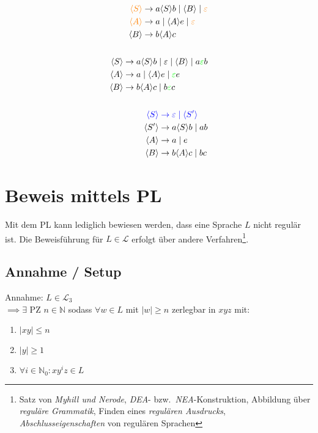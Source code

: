 \documentclass[a4paper,parskip=half,footsepline=on,headings=normal,titlepage=false]{scrartcl}
\newcommand{\nt}[1]{\langle \uppercase{#1} \rangle}
\renewcommand{\epsilon}{\varepsilon}
\begin{document}
\begin{subequations}
\begin{align}
    \label{eq:epsilon:1_search}
    \begin{split}
    \color{orange}\nt{S} & \to a \nt{S} b \mid \nt{B} \mid \color{orange}\epsilon \\
    \color{orange}\nt{A} & \to a \mid \nt{A}e \mid \color{orange}\epsilon \\
    \nt{B} & \to b\nt{A}c
    \end{split}
    \\ \nonumber \\
    \label{eq:epsilon:2_elemination}
    \begin{split}
    \nt{S} & \to a \nt{S} b \mid \epsilon \mid \nt{B} \mid a{\color{green}\epsilon}b \\
    \nt{A} & \to a \mid \nt{A}e \mid {\color{green}\epsilon}e \\
    \nt{B} & \to b\nt{A}c \mid b{\color{green}\epsilon}c
    \end{split}
    \\ \nonumber \\
    \label{eq:epsilon:3_isolation}
    \begin{split}
    \color{blue}\nt{S} & \color{blue}\to \epsilon \mid \nt{S'} \\
    \nt{S'} & \to a \nt{S} b \mid ab \\
    \nt{A} & \to a \mid e \\
    \nt{B} & \to b\nt{A}c \mid bc
    \end{split}
\end{align}
\end{subequations}

\section{Beweis mittels \acl{PL}}
Mit dem \ac{PL} kann lediglich bewiesen werden, dass eine Sprache $L$ nicht regulär ist.
Die Beweisführung für $L \in \mathcal{L}$ erfolgt über andere Verfahren\footnote{Satz von \emph{Myhill und Nerode}, \emph{\acs{DEA}}- bzw.\ \emph{\acs{NEA}}-Konstruktion, Abbildung über \emph{reguläre Grammatik}, Finden eines \emph{regulären Ausdrucks}, \emph{Abschlusseigenschaften} von regulären Sprachen}.

\subsection{Annahme / Setup}
Annahme: $L \in \mathcal{L}_3$ \\
$\implies \exists$ \acl{PZ} $n \in \mathbb{N}$ sodass $\forall w \in L$ mit $|w| \ge n$ zerlegbar in $xyz$ mit:
\begin{enumerate}
    \item $|xy| \le n$
    \item $|y| \ge 1$
    \item $\forall i \in \mathbb{N}_0 : xy^iz \in L$
\end{enumerate}
\end{document}
